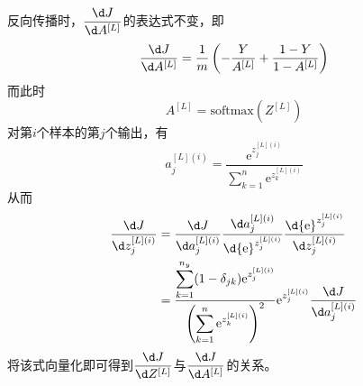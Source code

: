 反向传播时，$\dfrac{\d J}{\d A^{[L]}}$的表达式不变，即
\begin{equation}
    \frac{\d J}{\d A^{[L]}} 
    = \frac{1}{m} \left(-\frac{Y}{A^{[L]}} + \frac{1 - Y}{1 - A^{[L]}}\right)
\end{equation}
而此时
\begin{equation}
     A^{[L]} = \mathrm{softmax}\left( Z^{[L]} \right)
\end{equation}
对第$i$个样本的第$j$个输出，有
\begin{equation}
    a_j^{[L](i)} = \frac{{\mathrm{e}}^{z_j^{[L](i)}}}{\displaystyle \sum_{k=1}^n {\mathrm{e}}^{z_k^{[L](i)}}}
\end{equation}
从而
\begin{equation}
    \begin{aligned}
        \dfrac{\d J}{\d z_j^{[L](i)}}
        &= \dfrac{\d J}{\d a_j^{[L](i)}} \dfrac{\d a_j^{[L](i)}}{\d {\mathrm{e}}^{z_j^{[L](i)}}} \dfrac{\d {\mathrm{e}}^{z_j^{[L](i)}}}{\d z_j^{[L](i)}} \\
        &= \dfrac{\displaystyle \sum_{k=1}^{n_y} (1 - \delta_{jk}) {\mathrm{e}}^{z_j^{[L](i)}}}{\left( {\displaystyle \sum_{k=1}^n {\mathrm{e}}^{z_k^{[L](i)}}} \right)^2} {\mathrm{e}}^{z_j^{[L](i)}} \dfrac{\d J}{\d a_j^{[L](i)}} \\
    \end{aligned}
\end{equation}
将该式向量化即可得到$\dfrac{\d J}{\d Z^{[L]}}$与$\dfrac{\d J}{\d A^{[L]}}$的关系。
